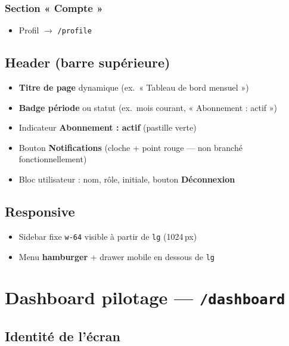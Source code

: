 \documentclass[11pt,a4paper]{report}
\newcommand{\route}[1]{\texttt{\small #1}}
\begin{document}
\subsection{Section « Compte »}
\begin{itemize}[leftmargin=1.5em]
    \item Profil $\rightarrow$ \route{/profile}
\end{itemize}

\section{Header (barre supérieure)}

\begin{itemize}[leftmargin=1.5em]
    \item \textbf{Titre de page} dynamique (ex.\ « Tableau de bord mensuel »)
    \item \textbf{Badge période} ou statut (ex.\ mois courant, « Abonnement : actif »)
    \item Indicateur \textbf{Abonnement : actif} (pastille verte)
    \item Bouton \textbf{Notifications} (cloche + point rouge — \textcolor{copifiwarn}{non branché fonctionnellement})
    \item Bloc utilisateur : nom, rôle, initiale, bouton \textbf{Déconnexion}
\end{itemize}

\section{Responsive}

\begin{itemize}[leftmargin=1.5em]
    \item Sidebar fixe \texttt{w-64} visible à partir de \texttt{lg} (1024\,px)
    \item Menu \textbf{hamburger} + drawer mobile en dessous de \texttt{lg}
\end{itemize}

\chapter{Dashboard pilotage — \route{/dashboard}}

\section{Identité de l'écran}
\end{document}
